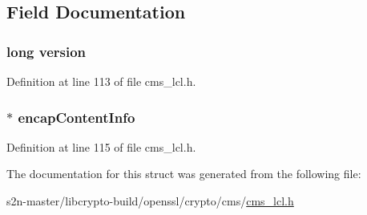 \subsection{Field Documentation}
\subsubsection[{\texorpdfstring{version}{version}}]{\setlength{\rightskip}{0pt plus 5cm}long version}\hypertarget{struct_c_m_s___signed_data__st_a17afc5cf84cee4b2123665f28ce85c9f}{}\label{struct_c_m_s___signed_data__st_a17afc5cf84cee4b2123665f28ce85c9f}


Definition at line 113 of file cms\+\_\+lcl.\+h.

\subsubsection[{\texorpdfstring{encap\+Content\+Info}{encapContentInfo}}]{$\ast$ encap\+Content\+Info}\hypertarget{struct_c_m_s___signed_data__st_a436b5725775d32c6f9a979b8d5a4f8b5}{}\label{struct_c_m_s___signed_data__st_a436b5725775d32c6f9a979b8d5a4f8b5}


Definition at line 115 of file cms\+\_\+lcl.\+h.



The documentation for this struct was generated from the following file\+:\begin{DoxyCompactItemize}
\item 
s2n-\/master/libcrypto-\/build/openssl/crypto/cms/\hyperlink{cms__lcl_8h}{cms\+\_\+lcl.\+h}\end{DoxyCompactItemize}
